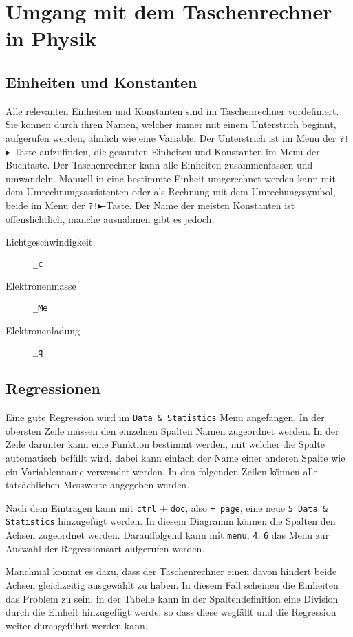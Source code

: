 \documentclass{article}
\begin{document}
\section{Umgang mit dem Taschenrechner in Physik} 
\subsection{Einheiten und Konstanten}
Alle relevanten Einheiten und Konstanten sind im Taschenrechner vordefiniert. Sie können durch ihren Namen, welcher immer mit einem Unterstrich beginnt, aufgerufen werden, ähnlich wie eine Variable. Der Unterstrich ist im Menu der \texttt{?!$\blacktriangleright$}-Taste aufzufinden, die gesamten Einheiten und Konstanten im Menu der Buchtaste. Der Taschenrechner kann alle Einheiten zusammenfassen und umwandeln. Manuell in eine bestimmte Einheit umgerechnet werden kann mit dem Umrechnungsassistenten oder als Rechnung mit dem Umrechungssymbol, beide im Menu der \texttt{?!$\blacktriangleright$}-Taste. \newline
Der Name der meisten Konstanten ist offenslichtlich, manche ausnahmen gibt es jedoch.
\begin{multicols}{3}
 \begin{description}
  \item[Lichtgeschwindigkeit] \texttt{\_c} 
  \item[Elektronenmasse] \texttt{\_Me}
  \item[Elektronenladung] \texttt{\_q} 
 \end{description} 
\end{multicols}  
\subsection{Regressionen}
Eine gute Regression wird im \texttt{Data \& Statistics} Menu angefangen. In der obersten Zeile müssen den einzelnen Spalten Namen zugeordnet werden. In der Zeile darunter kann eine Funktion bestimmt werden, mit welcher die Spalte automatisch befüllt wird, dabei kann einfach der Name einer anderen Spalte wie ein Variablenname verwendet werden. In den folgenden Zeilen können alle tatsächlichen Messwerte angegeben werden.
 
Nach dem Eintragen kann mit \texttt{ctrl} + \texttt{doc}, also \texttt{+ page}, eine neue \texttt{5 Data \& Statistics} hinzugefügt werden. In diesem Diagramm können die Spalten den Achsen zugeordnet werden. Darauffolgend kann mit \texttt{menu}, \texttt{4}, \texttt{6} das Menu zur Auswahl der Regressionsart aufgerufen werden.
 
Manchmal kommt es dazu, dass der Taschenrechner einen davon hindert beide Achsen gleichzeitig ausgewählt zu haben. In diesem Fall scheinen die Einheiten das Problem zu sein, in der Tabelle kann in der Spaltendefinition eine Division durch die Einheit hinzugefügt werde, so dass diese wegfällt und die Regression weiter durchgeführt werden kann. 
\end{document}
